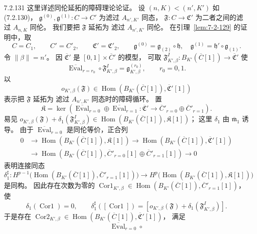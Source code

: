 \begin{remark}{7.2.131}\label{rem:7-2-131}
这里详述同伦延拓的障碍理论论证。
设 $(n,K)<(n',K')$ 如 (7.2.130)，
$\mathfrak g^{(0)},\mathfrak g^{(1)}
\colon C\to C'$ 为滤过 $A_{n',K'}$ 同态，
$\mathfrak F\colon C\to\mathfrak C'$
为二者之间的滤过 $A_{n,K}$ 同伦。
我们要把 $\mathfrak F$ 延拓为
滤过 $A_{n',K'}$ 同伦。
在引理~\ref{lem:7-2-129} 的证明中，取
\[
C=C_1,\qquad C'=C'_2,\qquad
\mathfrak C'=\mathfrak C'_2,\qquad
\mathfrak g^{(0)}=\mathfrak g_{(2)}\circ\mathfrak h,
\quad\mathfrak g^{(1)}=\mathfrak h'\circ\mathfrak g_{(1)}.
\]
令 $\|\beta\|=n'$。
因 $\overline{\mathfrak C}'$
是 $[0,1]\times\overline C'$ 的模型，
可取
$\mathfrak F^I_{K',\beta}\colon
B_{K'}(\overline C[1])\to\overline{\mathfrak C}'$
使
\[
\overline{\operatorname{Eval}}_{r=r_0}
\circ\mathfrak F^I_{K',\beta}
=\mathfrak g^{(r_0)}_{K',\beta},
\qquad r_0=0,1.
\]
以
\[
o_{K',\beta}(\mathfrak F)
\in\operatorname{Hom}
(B_{K'}(\overline C[1]),\overline{\mathfrak C}'[1])
\]
表示把 $\mathfrak F$ 延拓为
滤过 $A_{n',K'}$ 同态时的障碍循环。
置
\[
\mathfrak K=\ker\left(
\overline{\operatorname{Eval}}_{r=0}
\oplus\overline{\operatorname{Eval}}_{r=1}
\colon\overline{\mathfrak C}'
\longrightarrow
\overline C'_{r=0}\oplus\overline C'_{r=1}
\right).
\]
易见
$o_{K',\beta}(\mathfrak F)
+\delta_1(\mathfrak F^I_{K',\beta})
\in\operatorname{Hom}(B_{K'}(\overline C[1]),
\mathfrak K[1])$；
这里 $\delta_1$ 由 $\overline{\mathfrak m}_1$ 诱导。
由于 $\overline{\operatorname{Eval}}_{r=0}$
是同伦等价，正合列
\[
\begin{aligned}
0&\longrightarrow
\operatorname{Hom}(B_{K'}(\overline C[1]),\mathfrak K[1])
\longrightarrow
\operatorname{Hom}(B_{K'}(\overline C[1]),
\overline{\mathfrak C}'[1])\\
&\longrightarrow
\operatorname{Hom}(B_{K'}(\overline C[1]),
\overline C'_{r=0}[1]\oplus\overline C'_{r=1}[1])
\longrightarrow0
\end{aligned}
\]
表明连接同态
\[
\delta_1^\sharp\colon
H^{p-1}\bigl(\operatorname{Hom}
(B_{K'}(\overline C[1]),\overline C'_{r=1}[1])\bigr)
\longrightarrow
H^p\bigl(\operatorname{Hom}
(B_{K'}(\overline C[1]),\mathfrak K[1])\bigr)
\]
是同构。
因此存在次数为零的
$\operatorname{Cor1}_{K',\beta}
\in\operatorname{Hom}
(B_{K'}(\overline C[1]),\overline C'_{r=1}[1])$，
使
\[
\delta_1(\operatorname{Cor1})=0,
\qquad
\delta_1^\sharp([\operatorname{Cor1}])
=[o_{K',\beta}(\mathfrak F)
+\delta_1(\mathfrak F^I_{K',\beta})].
\]
于是存在
$\operatorname{Cor2}_{K',\beta}
\in\operatorname{Hom}
(B_{K'}(\overline C[1]),\overline{\mathfrak C}'[1])$，
满足
\[
\overline{\operatorname{Eval}}_{r=0}\circ
\]
\end{remark}
